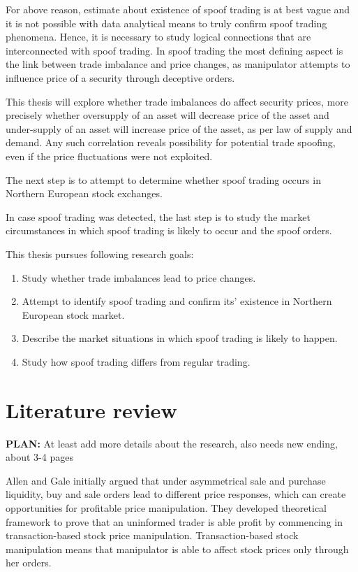 \documentclass{tut-thesis}
\begin{document}
For above reason, estimate about existence of spoof trading is at best vague and it is not possible with data analytical means to truly confirm spoof trading phenomena. Hence, it is necessary to study logical connections that are interconnected with spoof trading. In spoof trading the most defining aspect is the link between trade imbalance and price changes, as manipulator attempts to influence price of a security through deceptive orders.

This thesis will explore whether trade imbalances do affect security prices, more precisely whether oversupply of an asset will decrease price of the asset and under-supply of an asset will increase price of the asset, as per law of supply and demand. Any such correlation reveals possibility for potential trade spoofing, even if the price fluctuations were not exploited. 

The next step is to attempt to determine whether spoof trading occurs in Northern European stock exchanges. 

In case spoof trading was detected, the last step is to study the market circumstances in which spoof trading is likely to occur and the spoof orders.

This thesis pursues following research goals:
\begin{enumerate}
	\item Study whether trade imbalances lead to price changes.
	\item Attempt to identify spoof trading and confirm its' existence in Northern European stock market.
	\item Describe the market situations in which spoof trading is likely to happen.
	\item Study how spoof trading differs from regular trading.
\end{enumerate}

\section{Literature review}
\textbf{PLAN:} At least add more details about the research, also needs new ending, about 3-4 pages

Allen and Gale \parencite*{AllenGale1992} initially argued that under asymmetrical sale and purchase liquidity, buy and sale orders lead to different price responses, which can create opportunities for profitable price manipulation. They developed theoretical framework to prove that an uninformed trader is able profit by commencing in transaction-based stock price manipulation. Transaction-based stock manipulation means that manipulator is able to affect stock prices only through her orders. \autocite{AllenGale1992}
\end{document}
